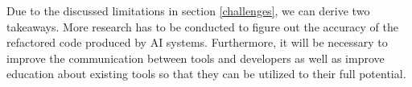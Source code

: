 Due to the discussed limitations in section \ref{challenges}, we can derive two takeaways.
More research has to be conducted to figure out the accuracy of the refactored code produced by AI systems.
Furthermore, it will be necessary to improve the communication between tools and developers as well as improve education about existing tools so that they can be utilized to their full potential.
